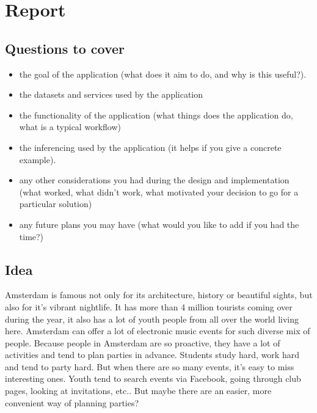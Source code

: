 \documentclass[12pt, a4paper, lithuanian]{article}
\begin{document}
\section{Report}

\subsection{Questions to cover}

\begin{itemize}
  
    \item the goal of the application (what does it aim to do, and why is this useful?).

    \item the datasets and services used by the application

    \item the functionality of the application (what things does the application do, what is a typical workflow)

    \item the inferencing used by the application (it helps if you give a concrete example).

    \item any other considerations you had during the design and implementation (what worked, what didn't work, what motivated your decision to go for a particular solution)

    \item any future plans you may have (what would you like to add if you had the time?)

\end{itemize}

\subsection{Idea}

  Amsterdam is famous not only for its architecture, history or beautiful sights, but also for it's vibrant nightlife. It has more than 4 million tourists coming over during the year, it also has a lot of youth people from all over the world living here. Amsterdam can offer a lot of electronic music events for such diverse mix of people. 
  Because people in Amsterdam are so proactive, they have a lot of activities and tend to plan parties in advance. Students study hard, work hard and tend to party hard. But when there are so many events, it's easy to miss interesting ones. Youth tend to search events via Facebook, going through club pages, looking at invitations, etc.. But maybe there are an easier, more convenient way of planning parties? 
\end{document}
